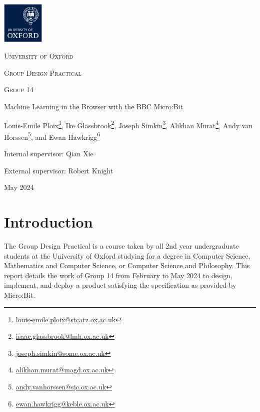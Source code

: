 \documentclass{article}
\begin{document}
\begin{titlepage}
  \centering
  \hphantom{}\par
  \vspace{2cm}
  \includegraphics[width=0.15\textwidth]{logo.png}\par\vspace{0.5cm}
  {\LARGE \textsc{University of Oxford}\par}\vspace{0.5cm}
  {\Large \textsc{Group Design Practical}\par}\vspace{0.5cm}
  {\large \textsc{Group 14}\par}\vspace{0.7cm}
  {\Huge Machine Learning in the Browser with the BBC Micro:Bit\par}\vspace{0.8cm}
  {\large Louis-Emile Ploix\footnote{\href{mailto:louis-emile.ploix@stcatz.ox.ac.uk}{louis-emile.ploix@stcatz.ox.ac.uk}}, Ike Glassbrook\footnote{\href{mailto:isaac.glassbrook@lmh.ox.ac.uk}{isaac.glassbrook@lmh.ox.ac.uk}}, Joseph Simkin\footnote{\href{mailto:joseph.simkin@some.ox.ac.uk}{joseph.simkin@some.ox.ac.uk}}, Alikhan Murat\footnote{\href{mailto:alikhan.murat@magd.ox.ac.uk}{alikhan.murat@magd.ox.ac.uk}}, Andy van Horssen\footnote{\href{mailto:andy.vanhorssen@sjc.ox.ac.uk}{andy.vanhorssen@sjc.ox.ac.uk}}, and Ewan Hawkrigg\footnote{\href{mailto:ewan.hawkrigg@keble.ox.ac.uk}{ewan.hawkrigg@keble.ox.ac.uk}}\par}\vspace{0.7cm}
  {\large Internal supervisor: Qian Xie\par \vspace{0.3cm} External supervisor: Robert Knight \par}\vspace{1cm}
  {\Large May 2024}
\end{titlepage}

\tableofcontents

\section{Introduction}%
\label{sec:intro}

The Group Design Practical is a course taken by all 2nd year undergraduate students at the University of Oxford studying for a degree in Computer Science, Mathematics and Computer Science, or Computer Science and Philosophy. This report details the work of Group 14 from February to May 2024 to design, implement, and deploy a product satisfying the specification as provided by Micro:Bit.
\end{document}
